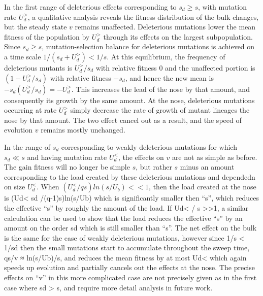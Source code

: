 \documentclass[12pt]{article}
\begin{document}
In the first range of deleterious effects corresponding to $s_d \geq s$, with mutation rate $U_d^{>}$, a qualitative analysis reveals the fitness distribution of the bulk changes, but the steady state $v$ remains unaffected.  Deleterious mutations lower the mean fitness of the population by $U_d^{>}$ through its effects on the largest subpopulation.  Since $s_d \geq s$, mutation-selection balance for deleterious mutations is achieved on a time scale $1/(s_d +U_d^{>}) < 1/s$.  At this equilibrium, the frequency of deleterious mutants is $U_d^{>}/s_d$ with relative fitness $0$ and the unaffected portion is $(1-U_d^{>}/s_d)$ with relative fitness $-s_d$, and hence the new mean is $-s_d (U_d^{>}/s_d) = -U_d^{>}$.  This increases the lead of the nose by that amount, and consequently its growth by the same amount.  At the nose, deleterious mutations occurring at rate $U_d^{>}$ simply decrease the rate of growth of mutant lineages the nose by that amount.  The two effect cancel out as a result, and the speed of evolution $v$ remains mostly unchanged.

In the range of $s_d$ corresponding to weakly deleterious mutations for which $s_d\ll s$ and having mutation rate $U_d^{<}$, the effects on $v$ are not as simple as before.  The gain fitness will no longer be simple $s$, but rather $s$ minus an amount corresponding to the load created by these deleterious mutations and dependedn on size $U_d^{<}$.  When $(U_d^{<} / qs)ln(s/U_b) <<1$, then the load created at the nose is (Ud< sd /(q-1)s)ln(s/Ub) which is significantly smaller then “s”, which reduces the effective “s” by roughly the amount of the load.
If  Ud< / s >>1, a similar calculation can be used to show that the load reduces the effective “s” by an amount on the order sd which is still smaller than “s”.
The net effect on the bulk is the same for the case of weakly deleterious mutations, however since 1/s < 1/sd then the small mutations start to accumulate throughout the sweep time, qs/v ≈ ln(s/Ub)/s, and reduces the mean fitness by at most Ud< which again speeds up evolution and partially cancels out the effects at the nose.
The precise effects on “v” in this more complicated case are not precisely given as in the first case where  sd > s, and require more detail analysis in future work.
\end{document}
